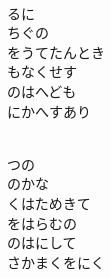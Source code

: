 \documentclass[10pt,b5j]{tarticle} %
\begin{document}
\begin{enumerate}
\begin{minipage}[c]{\blocksize}
    \end{minipage}
    \begin{minipage}[c]{\blocksize}
        
        \vspace{\linespace}
        \item~\\
        るに\\
        ちぐの\\
        をうてたんとき\\
        もなくせす\\
        のはへども\\
        にかへすあり
        
    \end{minipage}
    \begin{minipage}[c]{\blocksize}
        
        \vspace{\linespace}
        \item~\\
        つの\\
        のかな\\
        くはためきて\\
        をはらむの\\
        のはにして\\
        さかまくをにく
    
    \end{minipage}
\end{enumerate} %
\end{document}

